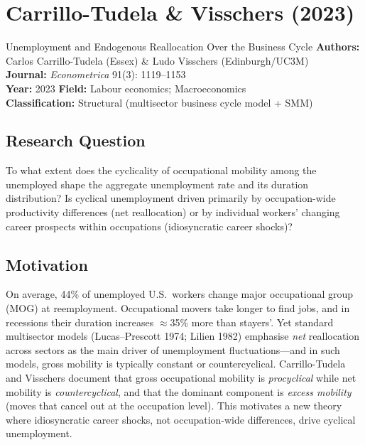 \chapter{Carrillo-Tudela \& Visschers (2023)}

\begin{paperbox}{Unemployment and Endogenous Reallocation Over the Business
Cycle}
\textbf{Authors:} Carlos Carrillo-Tudela (Essex) \& Ludo Visschers
(Edinburgh/UC3M)\\[3pt]
\textbf{Journal:} \textit{Econometrica} 91(3): 1119--1153\\[3pt]
\textbf{Year:} 2023 \quad\textbf{Field:} Labour economics; Macroeconomics\\[3pt]
\textbf{Classification:} Structural (multisector business cycle model + SMM)
\end{paperbox}

\section{Research Question}

To what extent does the cyclicality of occupational mobility among the
unemployed shape the aggregate unemployment rate and its duration distribution?
Is cyclical unemployment driven primarily by occupation-wide productivity
differences (net reallocation) or by individual workers' changing career
prospects within occupations (idiosyncratic career shocks)?

\section{Motivation}

On average, 44\% of unemployed U.S.\ workers change major occupational group
(MOG) at reemployment. Occupational movers take longer to find jobs, and in
recessions their duration increases $\approx$35\% more than stayers'. Yet
standard multisector models (Lucas--Prescott 1974; Lilien 1982) emphasise
\emph{net} reallocation across sectors as the main driver of unemployment
fluctuations---and in such models, gross mobility is typically constant or
countercyclical. Carrillo-Tudela and Visschers document that gross occupational
mobility is \emph{procyclical} while net mobility is \emph{countercyclical},
and that the dominant component is \emph{excess mobility} (moves that cancel
out at the occupation level). This motivates a new theory where idiosyncratic
career shocks, not occupation-wide differences, drive cyclical unemployment.

